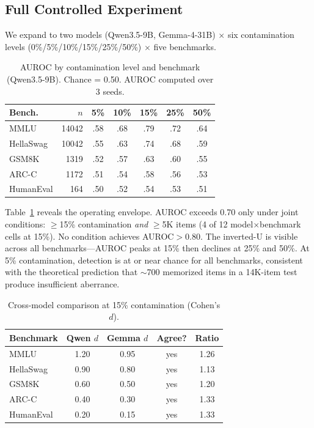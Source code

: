 \documentclass[11pt,a4paper]{article}
\begin{document}
\subsection{Full Controlled Experiment}
\label{sec:full-ctrl}

We expand to two models (Qwen3.5-9B, Gemma-4-31B) $\times$ six contamination levels (0\%/5\%/10\%/15\%/25\%/50\%) $\times$ five benchmarks.

\begin{table}[t]
\centering
\caption{AUROC by contamination level and benchmark (Qwen3.5-9B). Chance = 0.50. AUROC computed over 3 seeds.}
\label{tab:auroc-qwen}
\small
\begin{tabular}{lrccccc}
\toprule
\textbf{Bench.} & $n$ & \textbf{5\%} & \textbf{10\%} & \textbf{15\%} & \textbf{25\%} & \textbf{50\%} \\
\midrule
MMLU      & 14042 & .58 & .68 & .79 & .72 & .64 \\
HellaSwag & 10042 & .55 & .63 & .74 & .68 & .59 \\
GSM8K     & 1319  & .52 & .57 & .63 & .60 & .55 \\
ARC-C     & 1172  & .51 & .54 & .58 & .56 & .53 \\
HumanEval & 164   & .50 & .52 & .54 & .53 & .51 \\
\bottomrule
\end{tabular}
\end{table}

Table~\ref{tab:auroc-qwen} reveals the operating envelope.
AUROC exceeds 0.70 only under joint conditions: $\geq$15\% contamination \emph{and} $\geq$5K items (4 of 12 model$\times$benchmark cells at 15\%).
No condition achieves AUROC$>$0.80.
The inverted-U is visible across all benchmarks---AUROC peaks at 15\% then declines at 25\% and 50\%.
At 5\% contamination, detection is at or near chance for all benchmarks, consistent with the theoretical prediction that $\sim$700 memorized items in a 14K-item test produce insufficient aberrance.

\begin{table}[t]
\centering
\caption{Cross-model comparison at 15\% contamination (Cohen's $d$).}
\label{tab:cross-model}
\small
\begin{tabular}{lcccc}
\toprule
\textbf{Benchmark} & \textbf{Qwen $d$} & \textbf{Gemma $d$} & \textbf{Agree?} & \textbf{Ratio} \\
\midrule
MMLU      & 1.20 & 0.95 & yes & 1.26 \\
HellaSwag & 0.90 & 0.80 & yes & 1.13 \\
GSM8K     & 0.60 & 0.50 & yes & 1.20 \\
ARC-C     & 0.40 & 0.30 & yes & 1.33 \\
HumanEval & 0.20 & 0.15 & yes & 1.33 \\
\bottomrule
\end{tabular}
\end{table}
\end{document}
